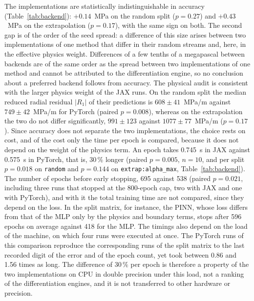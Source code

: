 \documentclass[pdflatex,sn-basic,Numbered]{sn-jnl}
\begin{document}
The implementations are statistically indistinguishable in accuracy (Table~\ref{tab:backend}): $+0.14$~MPa on the random split ($p=0.27$) and $+0.43$~MPa on the extrapolation ($p=0.17$), with the same sign on both. The second gap is of the order of the seed spread: a difference of this size arises between two implementations of one method that differ in their random streams and, here, in the effective physics weight.
Differences of a few tenths of a megapascal between backends are of the same order as the
spread between two implementations of one method and cannot be attributed to the differentiation
engine, so no conclusion about a preferred backend follows from accuracy.
The physical audit is consistent with the larger physics weight of the JAX runs. On the random split the median reduced radial residual $|R_1|$ of their predictions is $608\pm41$~MPa/m against $749\pm42$~MPa/m for PyTorch (paired $p=0.008$), whereas on the extrapolation the two do not differ significantly, $991\pm123$ against $1077\pm77$~MPa/m ($p=0.17$).
Since accuracy does not separate the two implementations, the choice rests on cost, and of the cost only the time per epoch is compared, because it does not depend on the weight of the physics term. An epoch takes 0.745~s in JAX against 0.575~s in PyTorch, that is, 30\,\% longer (paired $p=0.005$, $n=10$, and per split $p=0.018$ on \texttt{random} and $p=0.144$ on \texttt{extrap:alpha\_max}, Table~\ref{tab:backend}). The number of epochs before early stopping, 695 against 538 (paired $p=0.021$, including three runs that stopped at the 800-epoch cap, two with JAX and one with PyTorch), and with it the total training time are not compared, since they depend on the loss. In the split matrix, for instance, the PINN, whose loss differs from that of the MLP only by the physics and boundary terms, stops after 596 epochs on average against 418 for the MLP. The timings also depend on the load of the machine, on which four runs were executed at once. The PyTorch runs of this comparison reproduce the corresponding runs of the split matrix to the last recorded digit of the error and of the epoch count, yet took between 0.86 and 1.56 times as long.
The difference of 30\,\% per epoch is therefore a property of the two implementations on CPU in double precision under this load, not a ranking of the differentiation engines, and it is not transferred to other hardware or precision.
\end{document}
